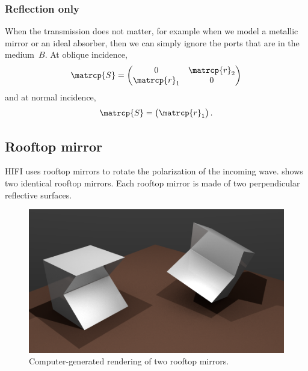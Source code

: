 \begin{refsection}
\subsubsection{Reflection only}
When the transmission does not matter, for example when we model a metallic mirror or an ideal absorber, then we can simply ignore the ports that are in the medium~$B$.
At oblique incidence,
\begin{equation}
    \matrcp{S}
    =
    \begin{pmatrix}
        0            & \matrcp{r}_2 \\
        \matrcp{r}_1 & 0 
    \end{pmatrix}
\end{equation}
and at normal incidence,
\begin{equation}
    \matrcp{S}
    =
    \begin{pmatrix}
        \matrcp{r}_1
    \end{pmatrix}
    \text{.}
\end{equation}



\subsection{Rooftop mirror}
HIFI uses rooftop mirrors to rotate the polarization of the incoming wave.
 shows two identical rooftop mirrors.
Each rooftop mirror is made of two perpendicular reflective surfaces.
\begin{figure}
    \centering
    \includegraphics[width=\textwidth]{rooftop_render}
    \caption{Computer-generated rendering of two rooftop mirrors.}
    \label{fig:rooftop_render}
\end{figure}


\end{refsection}
